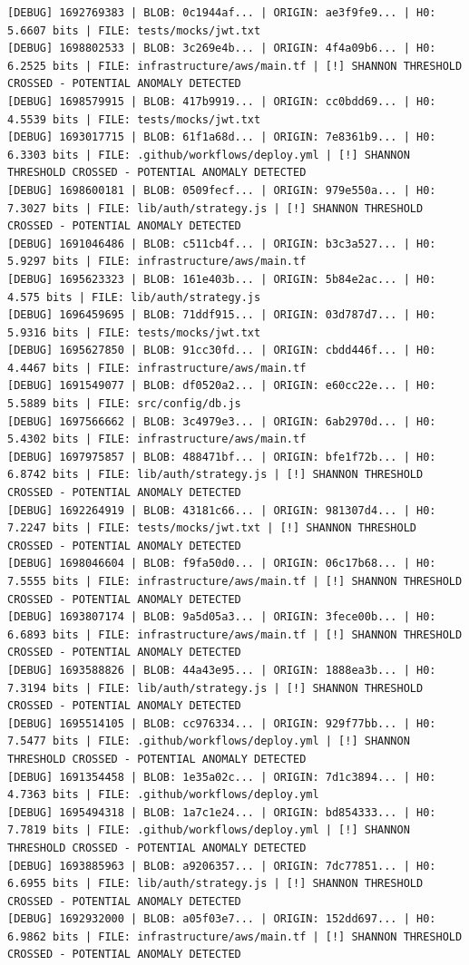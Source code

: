 \documentclass[12pt, a4paper, oneside]{report}
\begin{document}
\begin{lstlisting}[basicstyle=\tiny\ttfamily]
[DEBUG] 1692769383 | BLOB: 0c1944af... | ORIGIN: ae3f9fe9... | H0: 5.6607 bits | FILE: tests/mocks/jwt.txt
[DEBUG] 1698802533 | BLOB: 3c269e4b... | ORIGIN: 4f4a09b6... | H0: 6.2525 bits | FILE: infrastructure/aws/main.tf | [!] SHANNON THRESHOLD CROSSED - POTENTIAL ANOMALY DETECTED
[DEBUG] 1698579915 | BLOB: 417b9919... | ORIGIN: cc0bdd69... | H0: 4.5539 bits | FILE: tests/mocks/jwt.txt
[DEBUG] 1693017715 | BLOB: 61f1a68d... | ORIGIN: 7e8361b9... | H0: 6.3303 bits | FILE: .github/workflows/deploy.yml | [!] SHANNON THRESHOLD CROSSED - POTENTIAL ANOMALY DETECTED
[DEBUG] 1698600181 | BLOB: 0509fecf... | ORIGIN: 979e550a... | H0: 7.3027 bits | FILE: lib/auth/strategy.js | [!] SHANNON THRESHOLD CROSSED - POTENTIAL ANOMALY DETECTED
[DEBUG] 1691046486 | BLOB: c511cb4f... | ORIGIN: b3c3a527... | H0: 5.9297 bits | FILE: infrastructure/aws/main.tf
[DEBUG] 1695623323 | BLOB: 161e403b... | ORIGIN: 5b84e2ac... | H0: 4.575 bits | FILE: lib/auth/strategy.js
[DEBUG] 1696459695 | BLOB: 71ddf915... | ORIGIN: 03d787d7... | H0: 5.9316 bits | FILE: tests/mocks/jwt.txt
[DEBUG] 1695627850 | BLOB: 91cc30fd... | ORIGIN: cbdd446f... | H0: 4.4467 bits | FILE: infrastructure/aws/main.tf
[DEBUG] 1691549077 | BLOB: df0520a2... | ORIGIN: e60cc22e... | H0: 5.5889 bits | FILE: src/config/db.js
[DEBUG] 1697566662 | BLOB: 3c4979e3... | ORIGIN: 6ab2970d... | H0: 5.4302 bits | FILE: infrastructure/aws/main.tf
[DEBUG] 1697975857 | BLOB: 488471bf... | ORIGIN: bfe1f72b... | H0: 6.8742 bits | FILE: lib/auth/strategy.js | [!] SHANNON THRESHOLD CROSSED - POTENTIAL ANOMALY DETECTED
[DEBUG] 1692264919 | BLOB: 43181c66... | ORIGIN: 981307d4... | H0: 7.2247 bits | FILE: tests/mocks/jwt.txt | [!] SHANNON THRESHOLD CROSSED - POTENTIAL ANOMALY DETECTED
[DEBUG] 1698046604 | BLOB: f9fa50d0... | ORIGIN: 06c17b68... | H0: 7.5555 bits | FILE: infrastructure/aws/main.tf | [!] SHANNON THRESHOLD CROSSED - POTENTIAL ANOMALY DETECTED
[DEBUG] 1693807174 | BLOB: 9a5d05a3... | ORIGIN: 3fece00b... | H0: 6.6893 bits | FILE: infrastructure/aws/main.tf | [!] SHANNON THRESHOLD CROSSED - POTENTIAL ANOMALY DETECTED
[DEBUG] 1693588826 | BLOB: 44a43e95... | ORIGIN: 1888ea3b... | H0: 7.3194 bits | FILE: lib/auth/strategy.js | [!] SHANNON THRESHOLD CROSSED - POTENTIAL ANOMALY DETECTED
[DEBUG] 1695514105 | BLOB: cc976334... | ORIGIN: 929f77bb... | H0: 7.5477 bits | FILE: .github/workflows/deploy.yml | [!] SHANNON THRESHOLD CROSSED - POTENTIAL ANOMALY DETECTED
[DEBUG] 1691354458 | BLOB: 1e35a02c... | ORIGIN: 7d1c3894... | H0: 4.7363 bits | FILE: .github/workflows/deploy.yml
[DEBUG] 1695494318 | BLOB: 1a7c1e24... | ORIGIN: bd854333... | H0: 7.7819 bits | FILE: .github/workflows/deploy.yml | [!] SHANNON THRESHOLD CROSSED - POTENTIAL ANOMALY DETECTED
[DEBUG] 1693885963 | BLOB: a9206357... | ORIGIN: 7dc77851... | H0: 6.6955 bits | FILE: lib/auth/strategy.js | [!] SHANNON THRESHOLD CROSSED - POTENTIAL ANOMALY DETECTED
[DEBUG] 1692932000 | BLOB: a05f03e7... | ORIGIN: 152dd697... | H0: 6.9862 bits | FILE: infrastructure/aws/main.tf | [!] SHANNON THRESHOLD CROSSED - POTENTIAL ANOMALY DETECTED
\end{lstlisting}
\end{document}
